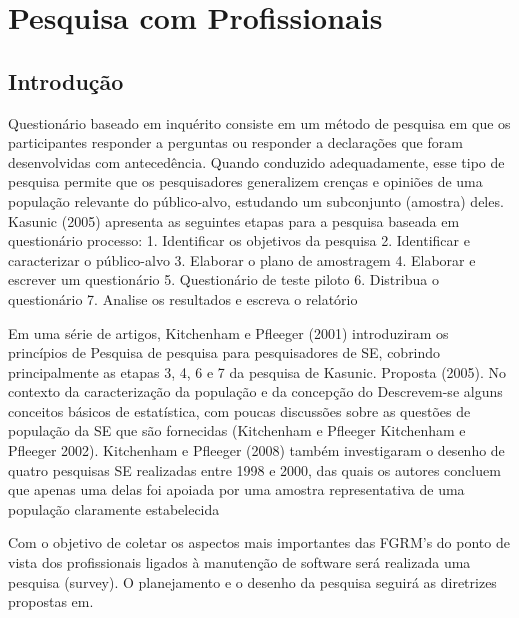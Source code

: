 \chapter{Pesquisa com Profissionais}
\label{ch:pesquisa-profissionais}

\section{Introdução}
\label{sec:pesquisa-profissionais-intro}

Questionário baseado em inquérito consiste em um método de pesquisa em que os
participantes responder a perguntas ou responder a declarações que foram
desenvolvidas com antecedência. Quando conduzido adequadamente, esse tipo de
pesquisa permite que os pesquisadores generalizem crenças e opiniões de uma
população relevante do público-alvo, estudando um subconjunto (amostra) deles.
Kasunic (2005) apresenta as seguintes etapas para a pesquisa baseada em
questionário
processo:
1. Identificar os objetivos da pesquisa
2. Identificar e caracterizar o público-alvo
3. Elaborar o plano de amostragem
4. Elaborar e escrever um questionário
5. Questionário de teste piloto
6. Distribua o questionário
7. Analise os resultados e escreva o relatório


Em uma série de artigos, Kitchenham e Pfleeger (2001) introduziram os princípios
de Pesquisa de pesquisa para pesquisadores de SE, cobrindo principalmente as
etapas 3, 4, 6 e 7 da pesquisa de Kasunic.  Proposta (2005). No contexto da
caracterização da população e da concepção do Descrevem-se alguns conceitos
básicos de estatística, com poucas discussões sobre as questões de população da
SE que são fornecidas (Kitchenham e Pfleeger Kitchenham e Pfleeger 2002).
Kitchenham e Pfleeger (2008) também investigaram o desenho de quatro pesquisas
SE realizadas entre 1998 e 2000, das quais os autores concluem que apenas uma
delas foi apoiada por uma amostra representativa de uma população claramente
estabelecida

Com o objetivo de coletar os aspectos mais importantes das FGRM's do ponto de
vista dos profissionais ligados à manutenção de software será realizada uma
pesquisa (survey). O planejamento e o desenho da pesquisa seguirá as diretrizes
propostas em\cite{wohlin2012experimentation}.


